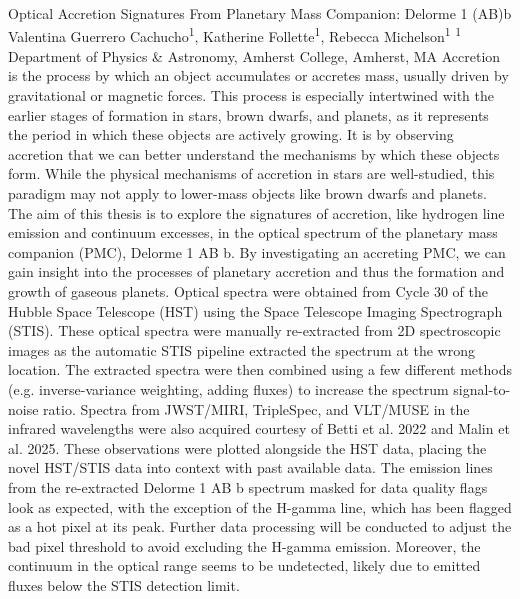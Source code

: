 \makeabstract
    {
    Optical Accretion Signatures From Planetary Mass Companion: Delorme 1 (AB)b
    }
    {
    Valentina Guerrero Cachucho\textsuperscript{1}, Katherine Follette\textsuperscript{1}, Rebecca Michelson\textsuperscript{1}
    }
    {
    \textsuperscript{1} Department of Physics \& Astronomy, Amherst College, Amherst, MA
    }
    {
    Accretion is the process by which an object accumulates or accretes mass, usually driven by gravitational or magnetic forces. This process is especially intertwined with the earlier stages of formation in stars, brown dwarfs, and planets, as it represents the period in which these objects are actively growing. It is by observing accretion that we can better understand the mechanisms by which these objects form. While the physical mechanisms of accretion in stars are well-studied, this paradigm may not apply to lower-mass objects like brown dwarfs and planets. The aim of this thesis is to explore the signatures of accretion, like hydrogen line emission and continuum excesses, in the optical spectrum of the planetary mass companion (PMC), Delorme 1 AB b. By investigating an accreting PMC, we can gain insight into the processes of planetary accretion and thus the formation and growth of gaseous planets.
    }
    {
    Optical spectra were obtained from Cycle 30 of the Hubble Space Telescope (HST) using the Space Telescope Imaging Spectrograph (STIS). These optical spectra were manually re-extracted from 2D spectroscopic images as the automatic STIS pipeline extracted the spectrum at the wrong location. The extracted spectra were then combined using a few different methods (e.g. inverse-variance weighting, adding fluxes) to increase the spectrum signal-to-noise ratio. Spectra from JWST/MIRI, TripleSpec, and VLT/MUSE in the infrared wavelengths were also acquired courtesy of Betti et al. 2022 and Malin et al. 2025. These observations were plotted alongside the HST data, placing the novel HST/STIS data into context with past available data.
    }
    {
    The emission lines from the re-extracted Delorme 1 AB b spectrum masked for data quality flags look as expected, with the exception of the H-gamma line, which has been flagged as a hot pixel at its peak. Further data processing will be conducted to adjust the bad pixel threshold to avoid excluding the H-gamma emission. Moreover, the continuum in the optical range seems to be undetected, likely due to emitted fluxes below the STIS detection limit. 
    }
